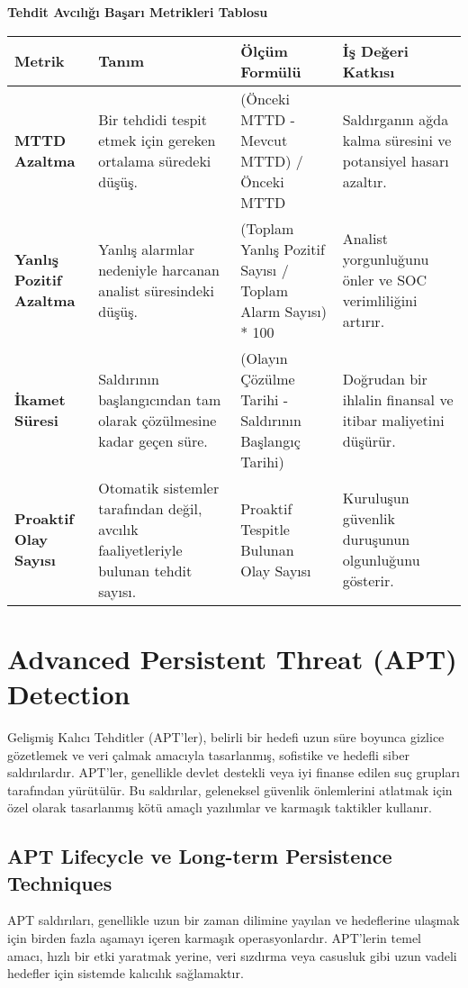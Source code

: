 \textbf{Tehdit Avcılığı Başarı Metrikleri Tablosu}

\begin{tabularx}{\textwidth}{|l|X|X|X|}
\hline
\textbf{Metrik} & \textbf{Tanım} & \textbf{Ölçüm Formülü} & \textbf{İş Değeri Katkısı} \\
\hline
\textbf{MTTD Azaltma} & Bir tehdidi tespit etmek için gereken ortalama süredeki düşüş. & (Önceki MTTD - Mevcut MTTD) / Önceki MTTD & Saldırganın ağda kalma süresini ve potansiyel hasarı azaltır. \\
\hline
\textbf{Yanlış Pozitif Azaltma} & Yanlış alarmlar nedeniyle harcanan analist süresindeki düşüş. & (Toplam Yanlış Pozitif Sayısı / Toplam Alarm Sayısı) * 100 & Analist yorgunluğunu önler ve SOC verimliliğini artırır. \\
\hline
\textbf{İkamet Süresi} & Saldırının başlangıcından tam olarak çözülmesine kadar geçen süre. & (Olayın Çözülme Tarihi - Saldırının Başlangıç Tarihi) & Doğrudan bir ihlalin finansal ve itibar maliyetini düşürür. \\
\hline
\textbf{Proaktif Olay Sayısı} & Otomatik sistemler tarafından değil, avcılık faaliyetleriyle bulunan tehdit sayısı. & Proaktif Tespitle Bulunan Olay Sayısı & Kuruluşun güvenlik duruşunun olgunluğunu gösterir. \\
\hline
\end{tabularx}

\section{Advanced Persistent Threat (APT) Detection}

Gelişmiş Kalıcı Tehditler (APT'ler), belirli bir hedefi uzun süre boyunca gizlice gözetlemek ve veri çalmak amacıyla tasarlanmış, sofistike ve hedefli siber saldırılardır. APT'ler, genellikle devlet destekli veya iyi finanse edilen suç grupları tarafından yürütülür. Bu saldırılar, geleneksel güvenlik önlemlerini atlatmak için özel olarak tasarlanmış kötü amaçlı yazılımlar ve karmaşık taktikler kullanır.

\subsection{APT Lifecycle ve Long-term Persistence Techniques}

APT saldırıları, genellikle uzun bir zaman dilimine yayılan ve hedeflerine ulaşmak için birden fazla aşamayı içeren karmaşık operasyonlardır. APT'lerin temel amacı, hızlı bir etki yaratmak yerine, veri sızdırma veya casusluk gibi uzun vadeli hedefler için sistemde kalıcılık sağlamaktır.

